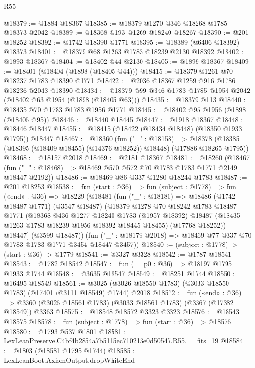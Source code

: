 \begin{lexlean}{R55}
\begin{coremodule}
@18379 := @1884 @18367
@18385 := @18379 @1270 @346 @18268 @1785 @18373 @2042
@18389 := @18368 @193 @1269 @18240 @18267
@18390 := @201 @18252
@18392 := @1742 @18390 @1771
@18395 := @18389 (@6406 @18392) @18373
@18401 := @18379 @68 @1263 @1783 @18239 @2130 @18392
@18402 := @1893 @18367
@18404 := @18402 @44 @2130
@18405 := @1899 @18367
@18409 := @18401 (@18404 (@1898 (@18405 @44)))
@18415 := @18379 @1261 @70 @18237 @1783 @18390 @1771
@18422 := @2036 @18367 @1259 @916 @1786 @18236 @2043 @18390
@18434 := @18379 @99 @346 @1783 @1785 @1954 @2042 (@18402 @63 @1954 (@1898 (@18405 @63)))
@18435 := @18379 @113
@18440 := @18435 @70 @1783 @1783 @1956 @1771
@18445 := @18402 @95 @1956 (@1898 (@18405 @95))
@18446 := @18440 @18445
@18447 := @1918 @18367
@18448 := @18446 @18447
@18455 := @18415 (@18422 (@18434 @18448) (@18350 @1933 @1795)) @18447
@18467 := @18360
    (fun ("_" : @18158) =>
    @18378 (@18385 (@18395 (@18409 @18455) (@14376 @18252)) @18448) (@17886 @18265 @1795))
@18468 := @18157 @2018
@18469 := @2181 @18367
@18481 := @18260
    (@18467 (fun ("_" : @18468) => @18469 @570 @572 @70 @1783 @1783 @1771 @2149 @18447 @2192))
@18486 := @18469 @86 @337 @1280 @18244 @1783
@18487 := @201 @18253
@18538 := fun (start : @36) =>
  fun (subject : @1778) =>
  fun («end» : @36) =>
  @18229
    (@18481
      (fun ("_" : @18180) =>
      @18486
        (@1742 @18487 @1771)
        (@3547 @18487)
        (@18379
          @1278
          @70
          @18242
          @1783
          @18487
          @1771
          (@18368
            @436
            @1277
            @18240
            @1783
            (@1957 @18392)
            @18487
            (@18435 @1263 @1783 @18239 @1956 @18392 @18445 @18455)
            (@17768 @18252))
          @18447)
        (@3599 @18487))
      (fun ("_" : @18179 @2018) => @18469 @77 @337 @70 @1783 @1783 @1771 @3454 @18447 @3457))
@18540 := (subject : @1778) -> (start : @36) -> @1779
@18541 := @3327 @3328
@18542 := @1787 @18541
@18543 := @1782 @18542
@18547 := fun (__p0 : @36) => @18197 @1795 @1933 @1744
@18548 := @3635 @18547
@18549 := @18251 @1744
@18550 := @16495 @18549
@18561 := @3025 (@3026 @18550 @1783) (@3033 @18550 @1783) (@17401 (@3111 @18549) @1744) @2018
@18572 := fun («end» : @36) =>
  @3360 (@3026 @18561 @1783) (@3033 @18561 @1783) (@3367 (@17382 @18549)) @3363
@18575 := @18548 @18572 @3323 @3323
@18576 := @18543 @18575
@18578 := fun (subject : @1778) => fun (start : @36) => @18576
@18580 := @1793 @537 @1801
@18581 := LexLeanPreserve.C4bf4b2854a7b5115ec710213e0d50547.R55.__fits_19
@18584 := @1803 (@18581 @1795 @1744)
@18585 := LexLeanBoot.AxiomOutput.dropWhiteEnd

\end{coremodule}
\end{lexlean}
